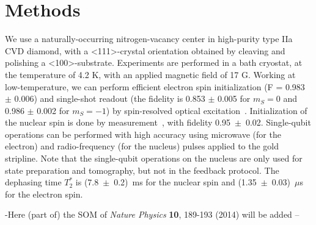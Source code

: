 
\section{Methods}
We use a naturally-occurring nitrogen-vacancy center in high-purity type IIa CVD diamond, with a \textless 111\textgreater-crystal orientation obtained by cleaving and polishing a \textless100\textgreater -substrate. Experiments are performed in a bath cryostat, at the temperature of 4.2 K, with an applied magnetic field of 17 G. Working at low-temperature, we can perform efficient electron spin initialization (F = 0.983 $\pm$ 0.006) and single-shot readout (the fidelity is 0.853 $\pm$ 0.005 for $m_S = 0$ and 0.986 $\pm$ 0.002 for $m_S = -1$) by spin-resolved optical excitation~\cite{Robledo_Nature_2011}. Initialization of the nuclear spin is done by measurement~\cite{Robledo_Nature_2011}, with fidelity  0.95~$\pm$~0.02. Single-qubit operations can be performed with high accuracy using microwave (for the electron) and radio-frequency (for the nucleus) pulses applied to the gold stripline. Note that the single-qubit operations on the nucleus are only used for state preparation and tomography, but not in the feedback protocol. The dephasing time $T_2^*$ is (7.8~$\pm$~0.2)~ms for the nuclear spin and (1.35~$\pm$~0.03)~$\mu$s for the electron spin. 

-Here (part of) the SOM of {\em Nature Physics} \textbf{10}, 189-193 (2014) will be added --


\newpage




